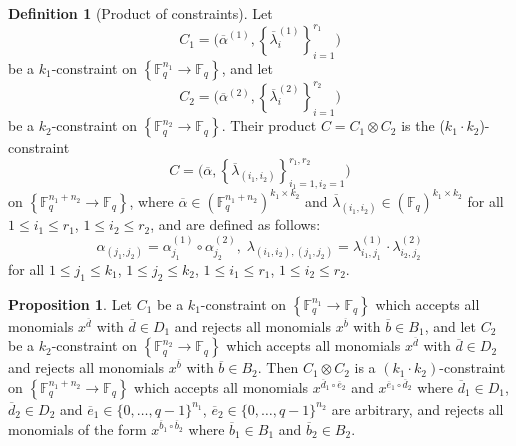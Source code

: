 \documentclass[10pt]{article}
\theoremstyle{definition}
\newtheorem{definition}[theorem]{Definition}
\newtheorem{proposition}[theorem]{Proposition}
\numberwithin{equation}{section}
\newcommand{\F}{{\mathbb{F}}}
\newcommand{\set}[1]{\left\{{#1}\right\}}
\begin{document}
\begin{definition}[Product of constraints]
Let $$C_1=\bigg(\overline \alpha^{(1)}, \set{\overline \lambda^{(1)}_i}_{i=1}^{r_1}\bigg)$$ be a $k_1$-constraint
on $\set{\F_q^{n_1} \to \F_q}$,
and let  $$C_2=\bigg(\overline \alpha^{(2)}, \set{\overline \lambda^{(2)}_i}_{i=1}^{r_2}\bigg)$$ be a $k_2$-constraint on $\set{\F_q^{n_2} \to \F_q}$.
Their product  $C = C_1 \otimes C_2$ is the ($k_1 \cdot k_2$)-constraint  $$C=\bigg(\overline \alpha, \set{\overline \lambda_{(i_1,i_2)}}_{i_1=1,i_2=1}^{r_1,r_2}\bigg)$$
on $\set{\F_q^{n_1+n_2} \to \F_q}$, where
$\overline \alpha \in (\F_{q}^{n_1+n_2})^{k_1 \times k_2}$ and $\overline \lambda_{(i_1,i_2)} \in (\F_q)^{k_1 \times k_2}$ for all $1 \leq i_1 \leq r_1$, $1 \leq i_2 \leq r_2$,  and are defined as follows:
\[\alpha_{(j_1,j_2)} =  \alpha^{(1)}_{j_1} \circ  \alpha^{(2)}_{j_2}  , \; \lambda_{(i_1,i_2),(j_1,j_2)} = \lambda^{(1)}_{i_1,j_1}\cdot \lambda^{(2)}_{i_2,j_2} \]
for all $1 \leq j_1 \leq k_1$, $1 \leq j_2\leq k_2$, $1 \leq i_1 \leq r_1$, $1 \leq i_2 \leq r_2$.
\end{definition}

\begin{proposition}\label{pro:product}
Let $C_1$ be a $k_1$-constraint on $\set{\F_{q}^{n_1}\to \F_q}$ which accepts all monomials $x^{\overline d}$ with  $\overline d \in D_1$ and rejects all monomials $x^{\overline b}$ with $\overline b \in B_1$, and
let $C_2$ be a $k_2$-constraint on $\set{\F_{q}^{n_2}\to \F_q}$ which accepts all monomials $x^{\overline d}$ with  $\overline d \in D_2$ and rejects all monomials
$x^{\overline b}$ with  $\overline b \in B_2$.
Then $C_1 \otimes C_2$  is a $(k_1\cdot k_2)$-constraint on $\set{\F_q^{n_1+n_2} \to \F_q}$ which accepts
all monomials $x^{\overline d_1 \circ \overline e_2}$ and $x^{\overline e_1 \circ \overline d_2}$ where
$\overline d_1 \in D_1$, $\overline d_2 \in D_2$ and $\overline e_1 \in \{0,\ldots,q-1\}^{n_1}$, $\overline e_2 \in \{0,\ldots,q-1\}^{n_2}$ are arbitrary,
and rejects all monomials of the form
$x^{\overline b_1 \circ \overline b_2}$ where $\overline b_1 \in B_1$ and $\overline b_2 \in B_2$.
\end{proposition}
\end{document}
